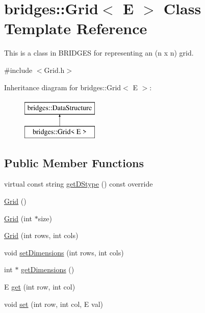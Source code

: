 \hypertarget{classbridges_1_1_grid}{}\section{bridges\+:\+:Grid$<$ E $>$ Class Template Reference}
\label{classbridges_1_1_grid}


This is a class in B\+R\+I\+D\+G\+ES for representing an (n x n) grid.  




{\ttfamily \#include $<$Grid.\+h$>$}

Inheritance diagram for bridges\+:\+:Grid$<$ E $>$\+:\begin{figure}[H]
\begin{center}
\leavevmode
\includegraphics[height=2.000000cm]{classbridges_1_1_grid}
\end{center}
\end{figure}
\subsection*{Public Member Functions}
\begin{DoxyCompactItemize}
\item 
virtual const string \mbox{\hyperlink{classbridges_1_1_grid_ab701d081de4f7ffafb15966758dd5446}{get\+D\+Stype}} () const override
\item 
\mbox{\hyperlink{classbridges_1_1_grid_a711e05a933c2a11c9e2775c74e6cf80d}{Grid}} ()
\item 
\mbox{\hyperlink{classbridges_1_1_grid_ad5c6c5e87eb40446ac794c5479937f87}{Grid}} (int $\ast$size)
\item 
\mbox{\hyperlink{classbridges_1_1_grid_af8bb9244c4c713f2325af6d4754ad1e9}{Grid}} (int rows, int cols)
\item 
void \mbox{\hyperlink{classbridges_1_1_grid_a8e5e4d92097f9d1481a14219eb5cc5a8}{set\+Dimensions}} (int rows, int cols)
\item 
int $\ast$ \mbox{\hyperlink{classbridges_1_1_grid_ad21e4fc94483ef822fda9b74a52b9f48}{get\+Dimensions}} ()
\item 
E \mbox{\hyperlink{classbridges_1_1_grid_aab69e77d9e1a51eabcf29c9c229cd35f}{get}} (int row, int col)
\item 
void \mbox{\hyperlink{classbridges_1_1_grid_acd750e5886349488257aba85f0b06f6f}{set}} (int row, int col, E val)
\end{DoxyCompactItemize}
